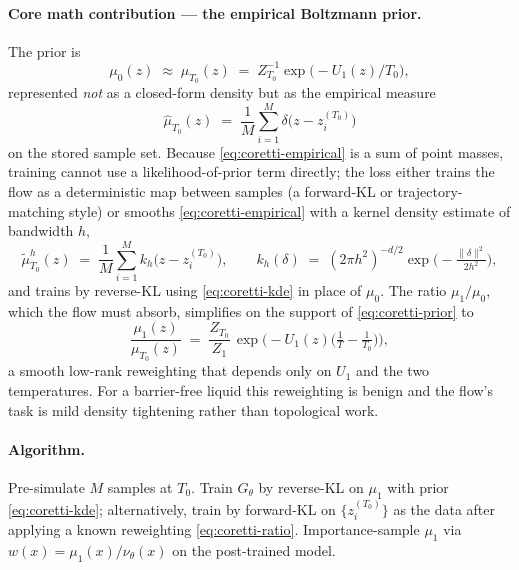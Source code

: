 \documentclass[11pt,letterpaper]{article}
\theoremstyle{plain}
\begin{document}
\paragraph{Core math contribution --- the empirical Boltzmann prior.}
The prior is
\begin{equation}\label{eq:coretti-prior}
  \mu_0(z) \;\approx\; \mu_{T_0}(z) \;=\; Z_{T_0}^{-1}\exp\!\big(-U_1(z)/T_0\big),
\end{equation}
represented \emph{not} as a closed-form density but as the empirical
measure
\begin{equation}\label{eq:coretti-empirical}
  \hat\mu_{T_0}(z) \;=\; \frac{1}{M}\sum_{i=1}^M \delta\!\big(z - z_i^{(T_0)}\big)
\end{equation}
on the stored sample set. Because \eqref{eq:coretti-empirical} is a sum of
point masses, training cannot use a likelihood-of-prior term directly; the
loss either trains the flow as a deterministic map between samples (a
forward-KL or trajectory-matching style) or smooths
\eqref{eq:coretti-empirical} with a kernel density estimate of bandwidth
$h$,
\begin{equation}\label{eq:coretti-kde}
  \tilde\mu_{T_0}^h(z) \;=\; \frac{1}{M}\sum_{i=1}^M k_h\!\big(z - z_i^{(T_0)}\big),\qquad
  k_h(\delta) \;=\; (2\pi h^2)^{-d/2}\exp\!\Big(-\tfrac{\|\delta\|^2}{2h^2}\Big),
\end{equation}
and trains by reverse-KL using \eqref{eq:coretti-kde} in place of $\mu_0$.
The ratio $\mu_1/\mu_0$, which the flow must absorb, simplifies on the
support of \eqref{eq:coretti-prior} to
\begin{equation}\label{eq:coretti-ratio}
  \frac{\mu_1(z)}{\mu_{T_0}(z)} \;=\; \frac{Z_{T_0}}{Z_1}\,\exp\!\Big(-U_1(z)\big(\tfrac{1}{T}-\tfrac{1}{T_0}\big)\Big),
\end{equation}
a smooth low-rank reweighting that depends only on $U_1$ and the two
temperatures. For a barrier-free liquid this reweighting is benign and
the flow's task is mild density tightening rather than topological work.

\paragraph{Algorithm.} Pre-simulate $M$ samples at $T_0$. Train $G_\theta$
by reverse-KL on $\mu_1$ with prior \eqref{eq:coretti-kde}; alternatively,
train by forward-KL on $\{z_i^{(T_0)}\}$ as the data after applying a
known reweighting \eqref{eq:coretti-ratio}. Importance-sample $\mu_1$ via
$w(x)=\mu_1(x)/\nu_\theta(x)$ on the post-trained model.
\end{document}
